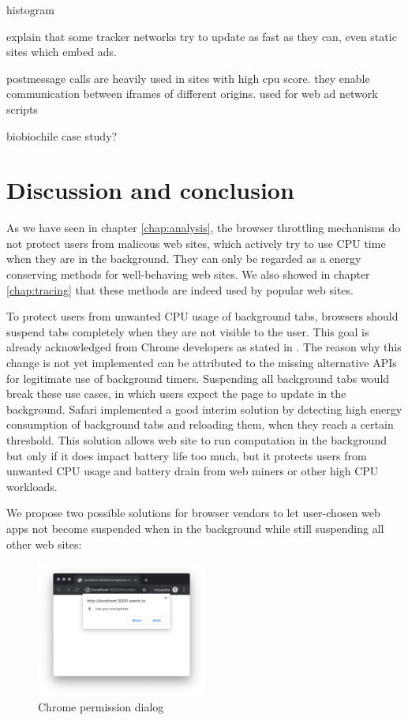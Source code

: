 \documentclass[
	ruledheaders=section,%
	class=report,%
	thesis={type=bachelor},%
	accentcolor=9c,%
	custommargins=true,%
	marginpar=false,%
	parskip=half-,%
	fontsize=11pt,%
]{tudapub}
\begin{document}
  histogram

  explain that some tracker networks try to update as fast as they can, even static sites which embed ads.

  postmessage calls are heavily used in sites with high cpu score. they enable communication between iframes of different origins. used for web ad network scripts

  biobiochile case study?
  
  
  
  \newpage
  \chapter{Discussion and conclusion}

  As we have seen in chapter \ref{chap:analysis}, the browser throttling mechanisms do not protect users from malicous web sites, which actively try to use CPU time when they are in the background. They can only be regarded as a energy conserving methods for well-behaving web sites. We also showed in chapter \ref{chap:tracing} that these methods are indeed used by popular web sites.

  To protect users from unwanted CPU usage of background tabs, browsers should suspend tabs completely when they are not visible to the user. This goal is already acknowledged from Chrome developers as stated in \cite{chrome-background-tabs-roadmap}. The reason why this change is not yet implemented can be attributed to the missing alternative APIs for legitimate use of background timers. Suspending all background tabs would break these use cases, in which users expect the page to update in the background. Safari implemented a good interim solution by detecting high energy consumption of background tabs and reloading them, when they reach a certain threshold. This solution allows web site to run computation in the background but only if it does impact battery life too much, but it protects users from unwanted CPU usage and battery drain from web miners or other high CPU workloads.

  We propose two possible solutions for browser vendors to let user-chosen web apps not become suspended when in the background while still suspending all other web sites:

  \begin{figure}
    \centering
    \includegraphics[width=0.5\textwidth]{images/microphone-permission.png}
    \caption{Chrome permission dialog}
    \label{fig:chrome-permission-dialog}
  \end{figure}
\end{document}
